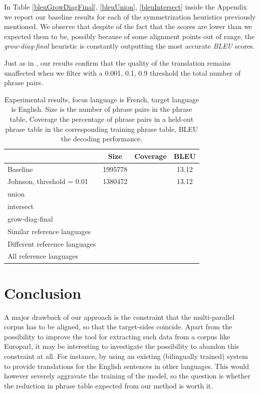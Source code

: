 \documentclass[11pt]{article}
\begin{document}


In Table \ref{bleuGrowDiagFinal}, \ref{bleuUnion}, \ref{bleuIntersect} inside the Appendix we report our baseline results for each of the symmetrization heuristics previously mentioned. We observe that despite of the fact that the scores are lower than we expected them to be, possibly because of some alignment points out of range, the \textit{grow-diag-final} heuristic is constantly outputting the most accurate \textit{BLEU} scores.

 Just as in \cite{Johnson}, our results confirm that the quality of the translation remains unaffected when we filter with a 0.001, 0.1, 0.9 threshold the total number of phrase pairs. 


\begin{table}[t]
\center
\begin{tabular}{p{.3\linewidth} | c c c }
&Size& Coverage & BLEU \\\hline\hline
Baseline &1995778&&13.12	\\
Johnson, threshold = 0.01&1380472&&13.12	\\\hline
union		\\
intersect	\\
grow-diag-final	\\\hline
Similar reference languages	\\
Different reference languages 	\\
All reference languages		\\\hline
\end{tabular}

\caption{Experimental results, focus language is French, target language is English. Size is the number of phrase pairs in the phrase table, Coverage the percentage of phrase pairs in a held-out phrase table in the corresponding training phrase table, BLEU the decoding performance.}
\end{table}






\section{Conclusion}

A major drawback of our approach is the constraint that the multi-parallel corpus has to be aligned, so that the target-sides coincide. Apart from the possibility to improve the tool for extracting such data from a corpus like Europarl, it may be interesting to investigate the possibility to abandon this constraint at all. For instance, by using an existing (bilingually trained) system to provide translations for the English sentences in other languages. This would however severely aggravate the training of the model, so the question is whether the reduction in phrase table expected from our method is worth it.
\end{document}
